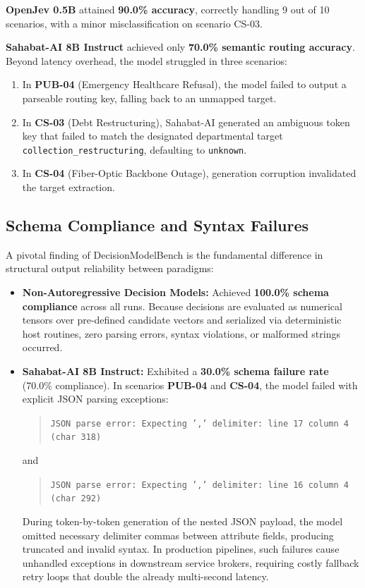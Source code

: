 \documentclass[journal,compsoc]{IEEEtran}
\begin{document}
\textbf{OpenJev 0.5B} attained \textbf{90.0\% accuracy}, correctly handling 9 out of 10 scenarios, with a minor misclassification on scenario CS-03.

\textbf{Sahabat-AI 8B Instruct} achieved only \textbf{70.0\% semantic routing accuracy}. Beyond latency overhead, the model struggled in three scenarios:
\begin{enumerate}
    \item In \textbf{PUB-04} (Emergency Healthcare Refusal), the model failed to output a parseable routing key, falling back to an unmapped target.
    \item In \textbf{CS-03} (Debt Restructuring), Sahabat-AI generated an ambiguous token key that failed to match the designated departmental target \texttt{collection\_restructuring}, defaulting to \texttt{unknown}.
    \item In \textbf{CS-04} (Fiber-Optic Backbone Outage), generation corruption invalidated the target extraction.
\end{enumerate}

\subsection{Schema Compliance and Syntax Failures}
A pivotal finding of DecisionModelBench is the fundamental difference in structural output reliability between paradigms:
\begin{itemize}
    \item \textbf{Non-Autoregressive Decision Models:} Achieved \textbf{100.0\% schema compliance} across all runs. Because decisions are evaluated as numerical tensors over pre-defined candidate vectors and serialized via deterministic host routines, zero parsing errors, syntax violations, or malformed strings occurred.
    \item \textbf{Sahabat-AI 8B Instruct:} Exhibited a \textbf{30.0\% schema failure rate} (70.0\% compliance). In scenarios \textbf{PUB-04} and \textbf{CS-04}, the model failed with explicit JSON parsing exceptions:
    \begin{quote}
    \texttt{JSON parse error: Expecting ',' delimiter: line 17 column 4 (char 318)}
    \end{quote}
    and
    \begin{quote}
    \texttt{JSON parse error: Expecting ',' delimiter: line 16 column 4 (char 292)}
    \end{quote}
    During token-by-token generation of the nested JSON payload, the model omitted necessary delimiter commas between attribute fields, producing truncated and invalid syntax. In production pipelines, such failures cause unhandled exceptions in downstream service brokers, requiring costly fallback retry loops that double the already multi-second latency.
\end{itemize}
\end{document}
